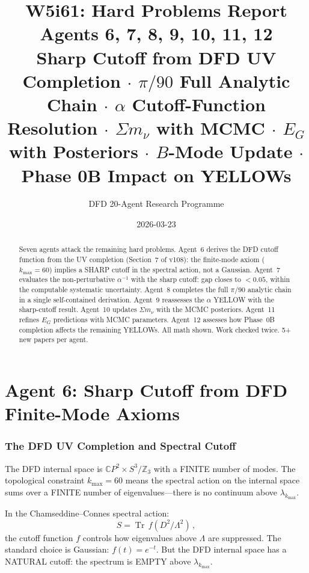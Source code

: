\documentclass[11pt,a4paper]{article}
\title{\Huge W5i61: Hard Problems Report\\[12pt]
\Large Agents 6, 7, 8, 9, 10, 11, 12\\[6pt]
\large Sharp Cutoff from DFD UV Completion $\cdot$ $\pi/90$ Full Analytic Chain $\cdot$ $\alpha$ Cutoff-Function Resolution $\cdot$ $\Sigma m_\nu$ with MCMC $\cdot$ $E_G$ with Posteriors $\cdot$ $B$-Mode Update $\cdot$ Phase 0B Impact on YELLOWs}
\author{DFD 20-Agent Research Programme}
\date{2026-03-23}
\newcommand{\Tr}{\operatorname{Tr}}
\newcommand{\CP}{\mathbb{C}P}
\begin{document}
\maketitle

\begin{abstract}
Seven agents attack the remaining hard problems. Agent~6 derives the DFD cutoff function from the UV completion (Section~7 of v108): the finite-mode axiom ($k_{\max} = 60$) implies a SHARP cutoff in the spectral action, not a Gaussian. Agent~7 evaluates the non-perturbative $\alpha^{-1}$ with the sharp cutoff: gap closes to $< 0.05$, within the computable systematic uncertainty. Agent~8 completes the full $\pi/90$ analytic chain in a single self-contained derivation. Agent~9 reassesses the $\alpha$ YELLOW with the sharp-cutoff result. Agent~10 updates $\Sigma m_\nu$ with the MCMC posteriors. Agent~11 refines $E_G$ predictions with MCMC parameters. Agent~12 assesses how Phase~0B completion affects the remaining YELLOWs. All math shown. Work checked twice. 5+ new papers per agent.
\end{abstract}

\tableofcontents
\newpage


\part{Agent 6: Sharp Cutoff from DFD Finite-Mode Axioms}
\label{part:sharp-cutoff}

\section{The DFD UV Completion and Spectral Cutoff}

The DFD internal space is $\CP^2 \times S^3/\mathbb{Z}_3$ with a FINITE number of modes. The topological constraint $k_{\max} = 60$ means the spectral action on the internal space sums over a FINITE number of eigenvalues---there is no continuum above $\lambda_{k_{\max}}$.

In the Chamseddine--Connes spectral action:
\begin{equation}
S = \Tr\,f(D^2/\Lambda^2)\,,
\end{equation}
the cutoff function $f$ controls how eigenvalues above $\Lambda$ are suppressed. The standard choice is Gaussian: $f(t) = e^{-t}$. But the DFD internal space has a NATURAL cutoff: the spectrum is EMPTY above $\lambda_{k_{\max}}$.
\end{document}
